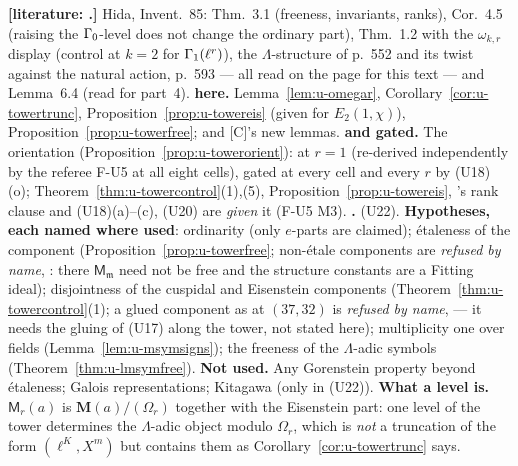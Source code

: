 \documentclass[11pt]{article}
\newcommand{\LIT}[1]{\textsf{[literature: #1]}}   %
\newcommand{\Iw}{\Lambda}                         %
\newcommand{\Om}[1]{\Omega_{#1}}                      %
\begin{document}
\begin{remark}\label{rmk:u-towerbasis}
\textbf{\LIT.} Hida, Invent.\ 85: Thm.~3.1 (freeness, invariants, ranks), Cor.~4.5 (raising the $\Gamma_0$-level does not change the ordinary part), Thm.~1.2 with the $\omega_{k,r}$ display (control
at $k=2$ for $\Gamma_1(\ell^{r})$), the $\Iw$-structure of p.~552 and its twist against the natural action, p.~593 --- all read on the page for this text --- and Lemma~6.4 (read for part~4).
\textbf{\PROVED{} here.} Lemma~\ref{lem:u-omegar}, Corollary~\ref{cor:u-towertrunc}, Proposition~\ref{prop:u-towereis} (given \STD{} for $E_2(1,\chi)$), Proposition~\ref{prop:u-towerfree}; and [C]'s new
lemmas. \textbf{\COMP{} and gated.} The orientation (Proposition~\ref{prop:u-towerorient}): \COMP{} at $r=1$ (re-derived independently by the referee F-U5 at all eight cells), gated at every cell and
every $r$ by (U18)(o); Theorem~\ref{thm:u-towercontrol}(1),(5), Proposition~\ref{prop:u-towereis}, 's rank clause and (U18)(a)--(c), (U20) are \PROVED{} \emph{given} it (F-U5 M3). \textbf{\CONJ.} (U22). \textbf{Hypotheses, each named where used}: ordinarity (only $e$-parts are
claimed); étaleness of the component (Proposition~\ref{prop:u-towerfree}; non-étale components are \emph{refused by name}, : there $\mathsf M_{\mathfrak m}$ need not be free and the
structure constants are a Fitting ideal); disjointness of the cuspidal and Eisenstein components (Theorem~\ref{thm:u-towercontrol}(1); a glued component as at $(37,32)$ is \emph{refused by name},
 --- it needs the gluing of (U17) along the tower, not stated here); multiplicity one over fields (Lemma~\ref{lem:u-msymsigns}); the freeness of the $\Iw$-adic symbols
(Theorem~\ref{thm:u-lmsymfree}). \textbf{Not used.} Any Gorenstein property beyond étaleness; Galois representations; Kitagawa (only in (U22)). \textbf{What a level is.} $\mathsf M_r(a)$ is
$\mathbf M(a)/(\Om r)$ together with the Eisenstein part: one level of the tower determines the $\Iw$-adic object modulo $\Om r$, which is \emph{not} a truncation of the form $(\ell^{K},X^{m})$ but
contains them as Corollary~\ref{cor:u-towertrunc} says.
\end{remark}
\end{document}
